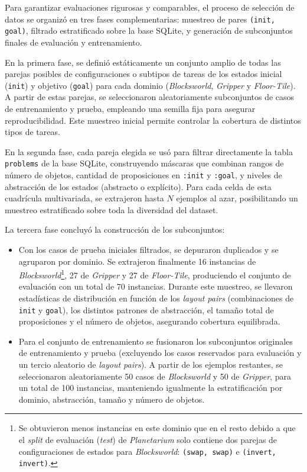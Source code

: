 Para garantizar evaluaciones rigurosas y comparables, el proceso de selección de datos se organizó en tres fases complementarias: muestreo de pares \texttt{(init, goal)}, filtrado estratificado sobre la base SQLite, y generación de subconjuntos finales de evaluación y entrenamiento.

En la primera fase, se definió estáticamente un conjunto amplio de todas las parejas posibles de configuraciones o subtipos de tareas de los estados inicial (\texttt{init}) y objetivo (\texttt{goal}) para cada dominio (\textit{Blocksworld}, \textit{Gripper} y \textit{Floor-Tile}). A partir de estas parejas, se seleccionaron aleatoriamente subconjuntos de casos de entrenamiento y prueba, empleando una semilla fija para asegurar reproducibilidad. Este muestreo inicial permite controlar la cobertura de distintos tipos de tareas.

En la segunda fase, cada pareja elegida se usó para filtrar directamente la tabla \texttt{problems} de la base SQLite, construyendo máscaras que combinan rangos de número de objetos, cantidad de proposiciones en \texttt{:init} y \texttt{:goal}, y niveles de abstracción de los estados (abstracto o explícito). Para cada celda de esta cuadrícula multivariada, se extrajeron hasta \(N\) ejemplos al azar, posibilitando un muestreo estratificado sobre toda la diversidad del dataset.

La tercera fase concluyó la construcción de los subconjuntos:  
\begin{itemize}  
  \item Con los casos de prueba iniciales filtrados, se depuraron duplicados y se agruparon por dominio. Se extrajeron finalmente 16 instancias de \textit{Blocksworld}\footnote{Se obtuvieron menos instancias en este dominio que en el resto debido a que el \textit{split} de evaluación (\textit{test}) de \textit{Planetarium} solo contiene dos parejas de configuraciones de estados para \textit{Blocksworld}: \texttt{(swap, swap)} e \texttt{(invert, invert)}.}, 27 de \textit{Gripper} y 27 de \textit{Floor-Tile}, produciendo el conjunto de evaluación con un total de 70 instancias. Durante este muestreo, se llevaron estadísticas de distribución en función de los \textit{layout pairs} (combinaciones de \texttt{init} y \texttt{goal}), los distintos patrones de abstracción, el tamaño total de proposiciones y el número de objetos, asegurando cobertura equilibrada.  
  \item Para el conjunto de entrenamiento se fusionaron los subconjuntos originales de entrenamiento y prueba (excluyendo los casos reservados para evaluación y un tercio aleatorio de \textit{layout pairs}). A partir de los ejemplos restantes, se seleccionaron aleatoriamente 50 casos de \textit{Blocksworld} y 50 de \textit{Gripper}, para un total de 100 instancias, manteniendo igualmente la estratificación por dominio, abstracción, tamaño y número de objetos.  
\end{itemize}

